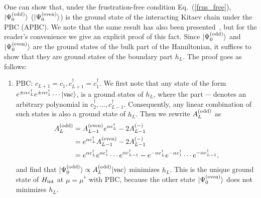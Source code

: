 \documentclass[aps, prb, showpacs, twocolumn, %
amssymb,superscriptaddress]{revtex4}
\def\dag{\dagger}
\begin{document}
One can show that, under the frustration-free condition Eq.~(\ref{frus_free}), $|\Psi^{\rm{(odd)}}_0\rangle$  ($|\Psi^{\rm{(even)}}_0\rangle$) is the ground state of the interacting Kitaev chain under the PBC (APBC). We note that the same result has also been presented~\cite{Shiozaki, Shiozaki2}, but for the reader's convenience we give an explicit proof of this fact. Since $|\Psi^{\rm{(odd)}}_0\rangle$  and $|\Psi^{\rm{(even)}}_0\rangle$ are the ground states of the bulk part of the Hamiltonian, it suffices to show that they are ground states of the boundary part $h_L$. The proof goes as follows:
\begin{enumerate}
\item{PBC: $c_{L+1}=c_{1}, c^{\dagger}_{L+1}=c^{\dagger}_1$.} 
\newline
We first note that any state of the form $e^{\pm\alpha c^\dag_L}e^{\pm\alpha c^\dag_{1}} \cdots |\rm{vac}\rangle$, is a ground states of $h_L$, where the part $\cdots$ denotes an arbitrary polynomial in $c^\dag_2, ..., c^\dag_{L-1}$. Consequently, any linear combination of such states is also a ground state of $h_L$. Then we rewrite $A_L^{(\rm{odd})}$ as
\begin{equation}
\begin{split}
A_L^{(\rm{odd})} &= A_{L-1}^{(\rm{even})}e^{\alpha c_L^\dagger}-2A_{L-1}^{(-)} \\
&= e^{\alpha c_L^\dagger}A_{L-1}^{(\rm{even})}-2A_{L-1}^{(-)} \\
&= e^{\alpha c^\dag_L}e^{\alpha c^\dag_1} \cdots  e^{\alpha c^\dag_{L-1}}-e^{-\alpha c^\dag_L}e^{-\alpha c^\dag_1} \cdots  e^{-\alpha c^\dag_{L-1}},
\end{split}
\end{equation}
and find that $\lvert\Psi^{\rm{(odd)}}_0\rangle\propto A_L^{\rm{(odd)}}\lvert\mathrm{vac}\rangle$ minimizes $h_L$. This is the unique ground state of $H_{\rm int}$ at $\mu=\mu^*$ with PBC,  because the other state $\lvert\Psi^{\rm{(even)}}_0\rangle$ does not minimizes $h_L$. 


\end{enumerate}
\end{document}

